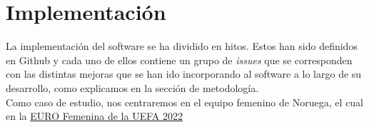 \chapter{Implementación}

La implementación del software se ha dividido en hitos. Estos han sido definidos en Github
y cada uno de ellos contiene un grupo de \textit{issues} que se corresponden con las distintas
mejoras que se han ido incorporando al software a lo largo de su desarrollo, como explicamos en la 
sección de metodología.\\

Como caso de estudio, nos centraremos en el equipo femenino de Noruega, el cual 
en la \href{https://es.uefa.com/womenseuro/}{EURO Femenina de la UEFA 2022}
